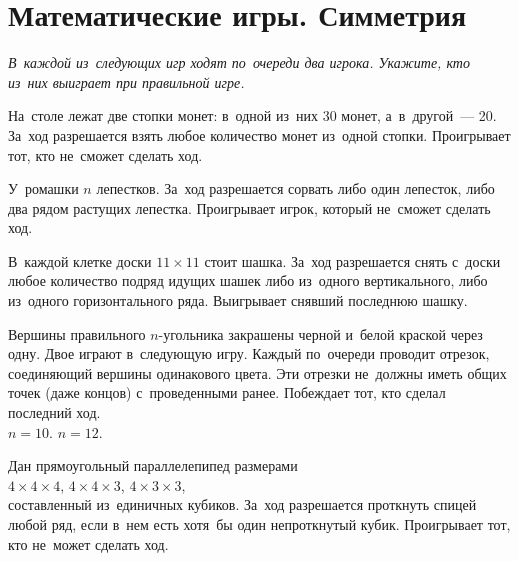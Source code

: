 
\section*{Математические игры. Симметрия}


\emph{%
В~каждой из~следующих игр ходят по~очереди два игрока.
Укажите, кто из~них выиграет при правильной игре.}

\begin{problems}

\itemx{$^\circ$}
На~столе лежат две стопки монет: в~одной из~них 30 монет, а~в~другой~--- 20.
За~ход разрешается взять любое количество монет из~одной стопки.
Проигрывает тот, кто не~сможет сделать ход.

\item
У~ромашки $n$ лепестков.
За~ход разрешается сорвать либо один лепесток, либо два рядом растущих
лепестка.
Проигрывает игрок, который не~сможет сделать ход.


\item
В~каждой клетке доски $11 \times 11$ стоит шашка.
За~ход разрешается снять с~доски любое количество подряд идущих шашек либо
из~одного вертикального, либо из~одного горизонтального ряда.
Выигрывает снявший последнюю шашку.

\item
Вершины правильного $n$-угольника закрашены черной и~белой краской через одну.
Двое играют в~следующую игру.
Каждый по~очереди проводит отрезок, соединяющий вершины одинакового цвета.
Эти отрезки не~должны иметь общих точек (даже концов) с~проведенными ранее.
Побеждает тот, кто сделал последний ход.
\\
\subproblem $n = 10$.
\qquad
\subproblem $n = 12$.

\item
Дан прямоугольный параллелепипед размерами
\\
\subproblem $4 \times 4 \times 4$,
\quad
\subproblem $4 \times 4 \times 3$,
\quad
\subproblem $4 \times 3 \times 3$,
\\
составленный из~единичных кубиков.
За~ход разрешается проткнуть спицей любой ряд, если в~нем есть хотя~бы один
непроткнутый кубик.
Проигрывает тот, кто не~может сделать ход.


\end{problems}
